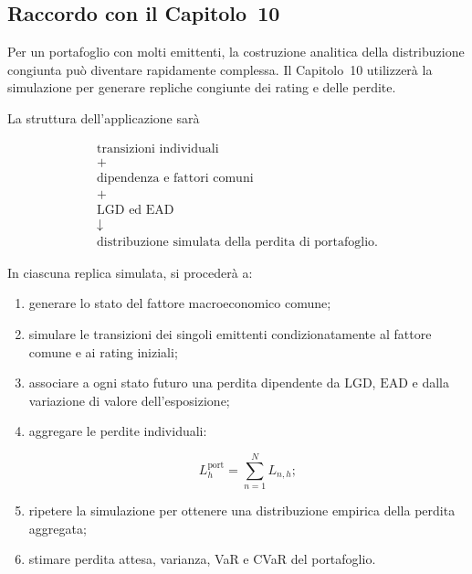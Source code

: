 \subsection{Raccordo con il Capitolo~10}

\label{subsec:cap9-raccordo-capitolo10}

Per un portafoglio con molti emittenti, la costruzione analitica della
distribuzione congiunta pu\`{o} diventare rapidamente complessa. Il
Capitolo~10 utilizzer\`{a} la simulazione per generare repliche congiunte
dei rating e delle perdite.

La struttura dell'applicazione sar\`{a}

\[
\boxed{
\begin{array}{c}
\text{transizioni individuali}
\\
+
\\
\text{dipendenza e fattori comuni}
\\
+
\\
\mathrm{LGD}\text{ ed }\mathrm{EAD}
\\
\downarrow
\\
\text{distribuzione simulata della perdita di portafoglio}.
\end{array}
}
\]

In ciascuna replica simulata, si proceder\`{a} a:

\begin{enumerate}

\item generare lo stato del fattore macroeconomico comune;

\item simulare le transizioni dei singoli emittenti condizionatamente
al fattore comune e ai rating iniziali;

\item associare a ogni stato futuro una perdita dipendente da
$\mathrm{LGD}$, $\mathrm{EAD}$ e dalla variazione di valore
dell'esposizione;

\item aggregare le perdite individuali:

\[
L_h^{\mathrm{port}}
=
\sum_{n=1}^{N}L_{n,h};
\]

\item ripetere la simulazione per ottenere una distribuzione empirica
della perdita aggregata;

\item stimare perdita attesa, varianza, VaR e CVaR del portafoglio.

\end{enumerate}

